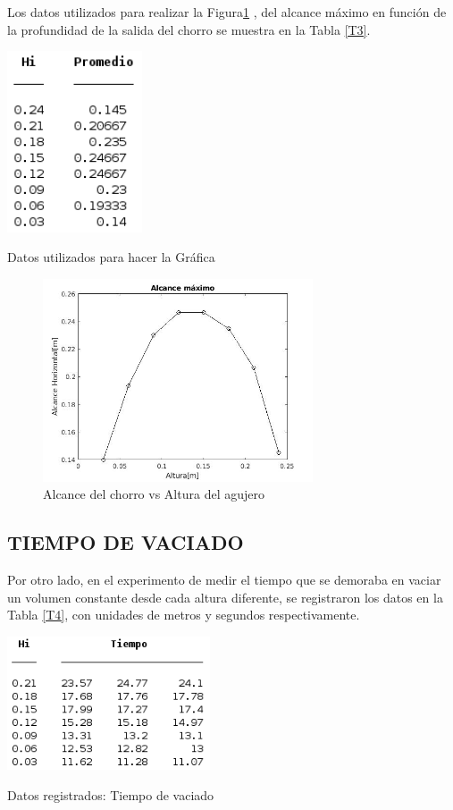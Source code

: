 \documentclass[journal,transmag]{IEEEtran}
\begin{document}
Los datos utilizados para realizar la Figura\ref{G1} , del alcance máximo en función de la profundidad de la salida del chorro se muestra en la Tabla \ref{T3}.    
\begin{table}[!h]
\center
\includegraphics[width=4cm]{tabla3.png}
\caption{Datos utilizados para hacer la Gráfica}
\label{T3}
\end{table}
  \begin{figure}[!h] 
\center
\includegraphics[width=8cm]{grafica1.jpg}
\caption{Alcance del chorro vs Altura del agujero}
\label{G1} 
\end{figure}

   
   
   

\subsection{TIEMPO DE VACIADO}

Por otro lado, en el experimento de medir el tiempo que se demoraba en vaciar un volumen constante desde cada altura diferente, se registraron los datos en la Tabla \ref{T4}, con unidades de metros y segundos respectivamente.  
\begin{table}[!h]
\center
\includegraphics[width=6cm]{tabla4.png}
\caption{Datos registrados: Tiempo de vaciado}
\label{T4}
\end{table}
 
\end{document}
